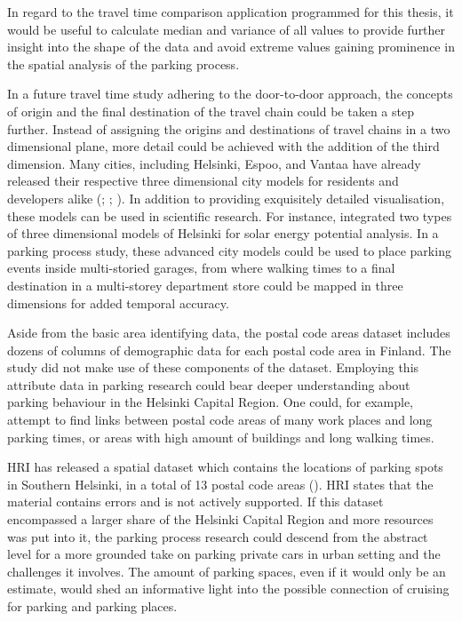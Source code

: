 In regard to the travel time comparison application programmed for this thesis, it would be useful to calculate median and variance of all values to provide further insight into the shape of the data and avoid extreme values gaining prominence in the spatial analysis of the parking process.

In a future travel time study adhering to the door-to-door approach, the concepts of origin and the final destination of the travel chain could be taken a step further. Instead of assigning the origins and destinations of travel chains in a two dimensional plane, more detail could be achieved with the addition of the third dimension. Many cities, including Helsinki, Espoo, and Vantaa have already released their respective three dimensional city models for residents and developers alike (\cite{Helsinginkaupunginkaupunginkanslia2020}; \cite{Espoonkaupungintekninen2018}; \cite{Vantaankaupunki2018}). In addition to providing exquisitely detailed visualisation, these models can be used in scientific research. For instance,  integrated two types of three dimensional models of Helsinki for solar energy potential analysis. In a parking process study, these advanced city models could be used to place parking events inside multi-storied garages, from where walking times to a final destination in a multi-storey department store could be mapped in three dimensions for added temporal accuracy.

Aside from the basic area identifying data, the postal code areas dataset includes dozens of columns of demographic data for each postal code area in Finland. The study did not make use of these components of the dataset. Employing this attribute data in parking research could bear deeper understanding about parking behaviour in the Helsinki Capital Region. One could, for example, attempt to find links between postal code areas of many work places and long parking times, or areas with high amount of buildings and long walking times.

HRI has released a spatial dataset which contains the locations of parking spots in Southern Helsinki, in a total of 13 postal code areas (\cite{Helsinginkaupunkiymparistontoimiala2017}). HRI states that the material contains errors and is not actively supported. If this dataset encompassed a larger share of the Helsinki Capital Region and more resources was put into it, the parking process research could descend from the abstract level for a more grounded take on parking private cars in urban setting and the challenges it involves. The amount of parking spaces, even if it would only be an estimate, would shed an informative light into the possible connection of cruising for parking and parking places.

